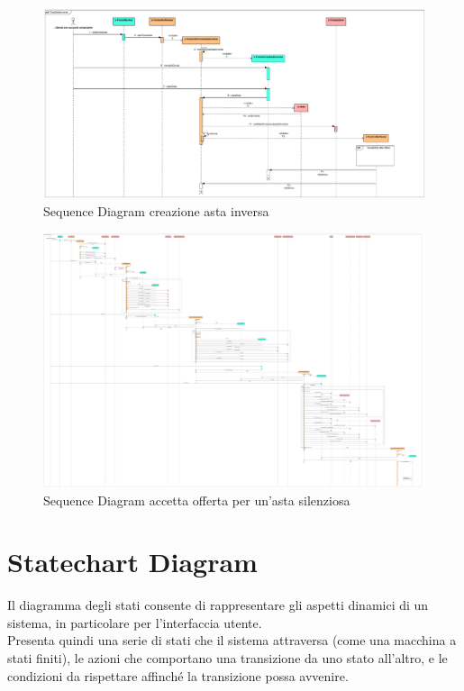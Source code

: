         \begin{figure}[htbp!]
        \centering
            \includegraphics[width=1\linewidth]{Immagini/Diagrammi/Sequence Diagram/CreaAstaInversa.pdf}
        \caption{Sequence Diagram creazione asta inversa}
        \end{figure}

        \begin{figure}[htbp!]
        \centering
            \includegraphics[width=1\linewidth]{Immagini/Diagrammi/Sequence Diagram/AccettaOffertaSilenziosa.pdf}
        \caption{Sequence Diagram accetta offerta per un'asta silenziosa}
        \end{figure}

    \clearpage
    
    \section{Statechart Diagram}
        Il diagramma degli stati consente di rappresentare gli aspetti dinamici di un sistema, in particolare per l'interfaccia utente. \\
        Presenta quindi una serie di stati che il sistema attraversa (come una macchina a stati finiti), le azioni che comportano una transizione da uno stato all'altro, e le condizioni da rispettare affinché la transizione possa avvenire.

